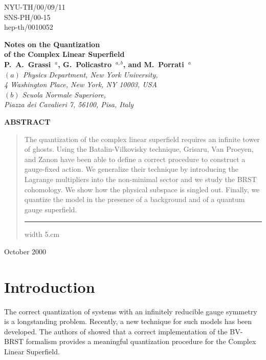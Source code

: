 \documentclass[a4paper,12pt]{article}
\begin{document}
\begin{titlepage}
\begin{flushright}
NYU-TH/00/09/11 \\
SNS-PH/00-15 \\
hep-th/0010052
\end{flushright}
\vfill
\begin{center}
{\LARGE\bf Notes on the Quantization \\ of the Complex Linear
  Superfield}    \\ 
  \large
{\bf  P.~A.~Grassi~$^a$, G.~Policastro~$^{a,b}$,  and  M.~Porrati~$^a$}\\
\vfill
{\small \it
$(a)$ Physics Department, New York University, \\ 
4 Washington Place, New York,  NY 10003,  USA \\ \vspace{.2cm}
$(b)$ Scuola Normale Superiore, \\ 
Piazza dei Cavalieri  7, 56100, Pisa, Italy \\}
\end{center}
\vfill

\begin{center}
{\bf ABSTRACT}
\end{center}
\begin{quote}
  The quantization of the complex linear superfield requires an
  infinite tower of ghosts.  Using the Batalin-Vilkovisky technique,
  Grisaru, Van Proeyen, and Zanon have been able to define a correct
  procedure to construct a gauge-fixed action.  We generalize their
  technique by introducing the Lagrange multipliers into the
  non-minimal sector and we study the BRST cohomology.
  We show how the physical subspace is singled out. Finally, we
  quantize the model in the presence of a background and of a quantum
  gauge superfield.  \vfill \hrule width 5.cm 
\end{quote}
\begin{flushleft}
October 2000
\end{flushleft}
\end{titlepage}


\section{Introduction}
\label{introduction}

The correct quantization of systems with an infinitely reducible gauge
symmetry is a longstanding problem. Recently, a new technique for such
models has been developed.  The authors of \cite{GPZ} showed that a
correct implementation of the BV-BRST \cite{BV,BRST}
formalism provides a meaningful quantization procedure for the Complex
Linear Superfield.
\end{document}
